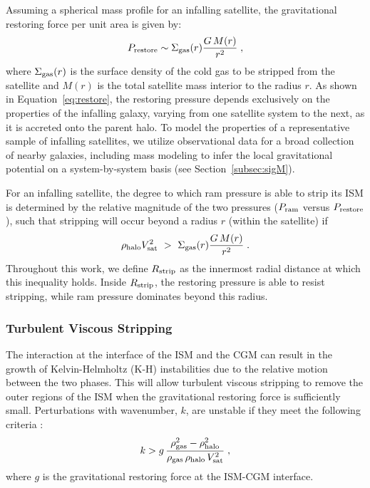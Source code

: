 Assuming a spherical mass profile for an infalling satellite, the
gravitational restoring force per unit area is given by:
%
\begin{equation}
P_{\rm restore} \sim \Sigma_{\rm gas}(r) \frac{G \, M(r)}{r^2}
\; ,
\label{eq:restore}
\end{equation}
%
where $\Sigma_{\rm gas}(r)$ is the surface density of the cold gas to
be stripped from the satellite and $M(r)$ is the total satellite mass
interior to the radius $r$.
%
As shown in Equation~\ref{eq:restore}, the restoring pressure depends
exclusively on the properties of the infalling galaxy, varying from
one satellite system to the next, as it is accreted onto the parent
halo.
%
To model the properties of a representative sample of infalling
satellites, we utilize observational data for a broad collection of
nearby galaxies, including mass modeling to infer the local
gravitational potential on a system-by-system basis (see
Section~\ref{subsec:sigM}).
%

For an infalling satellite, the degree to which ram pressure is able
to strip its ISM is determined by the relative magnitude of the two
pressures ($P_{\rm ram}$ versus $P_{\rm restore}$), such that
stripping will occur beyond a radius $r$ (within the satellite) if
%
\begin{equation}
\rho_{\rm halo} V_{\rm sat}^{2} \ > \ \Sigma_{\rm gas}(r)
\frac{G \, M(r)}{r^2}  \; .
\label{eq:test}
\end{equation}
%
Throughout this work, we define $R_{\rm strip}$ as the innermost
radial distance at which this inequality holds. 
%
Inside $R_{\rm strip}$, the restoring pressure is able to resist
stripping, while ram pressure dominates beyond this radius.

\subsubsection{Turbulent Viscous Stripping}

The interaction at the interface of the ISM and the CGM can result in
the growth of Kelvin-Helmholtz (K-H) instabilities due to the relative
motion between the two phases. 
This will allow turbulent viscous stripping to remove the outer
regions of the ISM when the gravitational restoring force is
sufficiently small. Perturbations with wavenumber, $k$, are unstable
if they meet the following criteria \citep{murray93, mori00}:
%
\begin{equation}
k > g \, \frac{\rho_{\rm gas}^{2} - \rho_{\rm halo}^{2}}{\rho_{\rm gas}
  \, \rho_{\rm halo} \, V_{\rm sat}^{2}} \; ,
\label{eq:k}
\end{equation}
%
where $g$ is the gravitational restoring force at the ISM-CGM
interface. 


